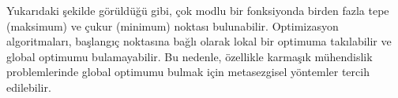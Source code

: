 Yukarıdaki şekilde görüldüğü gibi, çok modlu bir fonksiyonda birden fazla tepe (maksimum) ve çukur (minimum) noktası bulunabilir. Optimizasyon algoritmaları, başlangıç noktasına bağlı olarak lokal bir optimuma takılabilir ve global optimumu bulamayabilir. Bu nedenle, özellikle karmaşık mühendislik problemlerinde global optimumu bulmak için metasezgisel yöntemler tercih edilebilir.
